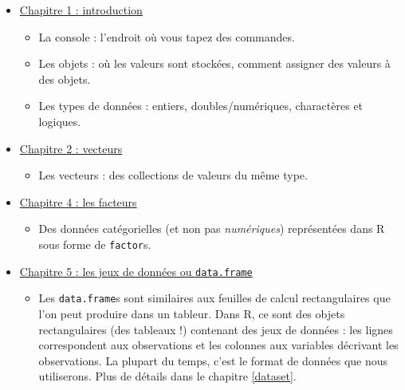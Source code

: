\documentclass[
  a4paper,
]{article}
\providecommand{\tightlist}{%
  \setlength{\itemsep}{0pt}\setlength{\parskip}{0pt}}
\begin{document}
\begin{itemize}
\tightlist
\item
  \href{https://campus.datacamp.com/courses/introduction-a-r/chapitre-1-introduction?ex=1}{Chapitre 1 : introduction}

  \begin{itemize}
  \tightlist
  \item
    La console : l'endroit où vous tapez des commandes.
  \item
    Les objets : où les valeurs sont stockées, comment assigner des valeurs à des objets.
  \item
    Les types de données : entiers, doubles/numériques, charactères et logiques.
  \end{itemize}
\item
  \href{https://campus.datacamp.com/courses/introduction-a-r/chapitre-2-les-vecteurs?ex=1}{Chapitre 2 : vecteurs}

  \begin{itemize}
  \tightlist
  \item
    Les vecteurs : des collections de valeurs du même type.
  \end{itemize}
\item
  \href{https://campus.datacamp.com/courses/introduction-a-r/chapitre-4-facteurs?ex=1}{Chapitre 4 : les facteurs}

  \begin{itemize}
  \tightlist
  \item
    Des données catégorielles (et non pas \emph{numériques}) représentées dans R sous forme de \texttt{factor}s.
  \end{itemize}
\item
  \href{https://campus.datacamp.com/courses/introduction-a-r/chapitre-5-les-jeux-de-donnees?ex=1}{Chapitre 5 : les jeux de données ou \texttt{data.frame}}

  \begin{itemize}
  \tightlist
  \item
    Les \texttt{data.frame}s sont similaires aux feuilles de calcul rectangulaires que l'on peut produire dans un tableur. Dans R, ce sont des objets rectangulaires (des tableaux !) contenant des jeux de données : les lignes correspondent aux observations et les colonnes aux variables décrivant les observations. La plupart du temps, c'est le format de données que nous utiliserons. Plus de détails dans le chapitre \ref{dataset}.
  \end{itemize}
\end{itemize}
\end{document}
